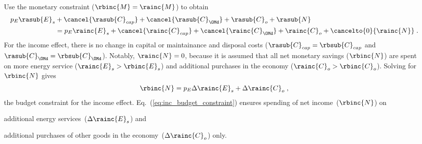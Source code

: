 \begin{landscape}
{Use the monetary constraint ($\rbinc{M} = \rainc{M}$) to obtain
%
\begin{align}
  p_E \rasub{E}_s &+ \cancel{\rasub{C}_{cap}} + \cancel{\rasub{C}_{\OMd}} + \rasub{C}_o + \rasub{N} \nonumber \\
                  &= p_E \rainc{E}_s + \cancel{\rainc{C}_{cap}} + \cancel{\rainc{C}_{\OMd}} + \rainc{C}_o + \cancelto{0}{\rainc{N}} \; .
\end{align}
%
For the income effect, there is no change in capital or maintainance and disposal costs
($\rasub{C}_{cap} = \rbsub{C}_{cap}$ and $\rasub{C}_{\OMd} = \rbsub{C}_{\OMd}$).
Notably, $\rainc{N} = 0$,
because it is assumed that all net monetary savings ($\rbinc{N}$) are spent on
more energy service ($\rainc{E}_s > \rbinc{E}_s$)
and
additional purchases in the economy ($\rainc{C}_o > \rbinc{C}_o$).
Solving for $\rbinc{N}$ gives 
%
\begin{equation} \label{eq:inc_budget_constraint}
  \rbinc{N} = p_E \Delta \rainc{E}_s + \Delta \rainc{C}_o \; ,
\end{equation}
%
the budget constraint for the income effect.
Eq.~(\ref{eq:inc_budget_constraint}) ensures
spending of net income~($\rbinc{N}$) on
%
\begin{enumerate*}[label={(\alph*)}]
	
  \item additional energy services~($\Delta \rainc{E}_s$) and
  
  \item additional purchases of other goods in the economy~($\Delta \rainc{C}_o$) only.
    
\end{enumerate*}
}
\end{landscape}
